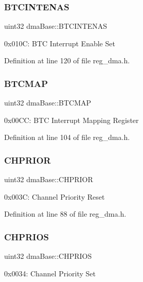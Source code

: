 \subsubsection{\texorpdfstring{B\+T\+C\+I\+N\+T\+E\+N\+AS}{BTCINTENAS}}
{\footnotesize\ttfamily uint32 dma\+Base\+::\+B\+T\+C\+I\+N\+T\+E\+N\+AS}

0x010C\+: B\+TC Interrupt Enable Set 

Definition at line 120 of file reg\+\_\+dma.\+h.

\mbox{\label{structdmaBase_a0bb6e9af988801ea066f0ea5c5972d1f}} 
\subsubsection{\texorpdfstring{B\+T\+C\+M\+AP}{BTCMAP}}
{\footnotesize\ttfamily uint32 dma\+Base\+::\+B\+T\+C\+M\+AP}

0x00\+CC\+: B\+TC Interrupt Mapping Register 

Definition at line 104 of file reg\+\_\+dma.\+h.

\mbox{\label{structdmaBase_abf0b888860e74923cbc2ea531c9601d9}} 
\subsubsection{\texorpdfstring{C\+H\+P\+R\+I\+OR}{CHPRIOR}}
{\footnotesize\ttfamily uint32 dma\+Base\+::\+C\+H\+P\+R\+I\+OR}

0x003C\+: Channel Priority Reset 

Definition at line 88 of file reg\+\_\+dma.\+h.

\mbox{\label{structdmaBase_a6e640cccc2de459d2c335f421ac8fa5b}} 
\subsubsection{\texorpdfstring{C\+H\+P\+R\+I\+OS}{CHPRIOS}}
{\footnotesize\ttfamily uint32 dma\+Base\+::\+C\+H\+P\+R\+I\+OS}

0x0034\+: Channel Priority Set 

